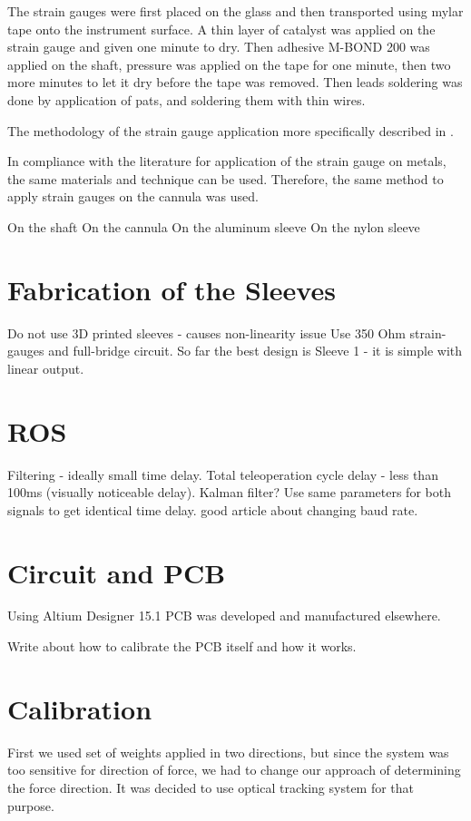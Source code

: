 The strain gauges were first placed on the glass and then transported using mylar tape onto the instrument surface. A thin layer of catalyst was applied on the strain gauge and given one minute to dry. Then adhesive M-BOND 200 was applied on the shaft, pressure was applied on the tape for one minute, then two more minutes to let it dry before the tape was removed. Then leads soldering was done by application of pats, and soldering them with thin wires. \cite{youtube}

The methodology of the strain gauge application more specifically described in \cite{StrGugeInst}.

In compliance with the literature \cite{StrGugeInst} for application of the strain gauge on metals, the same materials and technique can be used. Therefore, the same method to apply strain gauges on the cannula was used.

On the shaft
On the cannula
On the aluminum sleeve
On the nylon sleeve


\section{Fabrication of the Sleeves}
\label{sec:p1}

Do not use 3D printed sleeves - causes non-linearity issue
Use 350 Ohm strain-gauges and full-bridge circuit.
So far the best design is Sleeve 1 - it is simple with linear output.


\section{ROS}
\label{sec:p2}

Filtering - ideally small time delay. Total teleoperation cycle delay - less than 100ms (visually noticeable delay). Kalman filter? Use same parameters for both signals to get identical time delay.
good article about changing baud rate.

\section{Circuit and PCB}
\label{sec:p3}

Using Altium Designer 15.1 PCB was developed and manufactured elsewhere. 

Write about how to calibrate the PCB itself and how it works.

\section{Calibration}
\label{section:Calibration}
First we used set of weights applied in two directions, but since the system was too sensitive for direction of force, we had to change our approach of determining the force direction. It was decided to use optical tracking system for that purpose.

